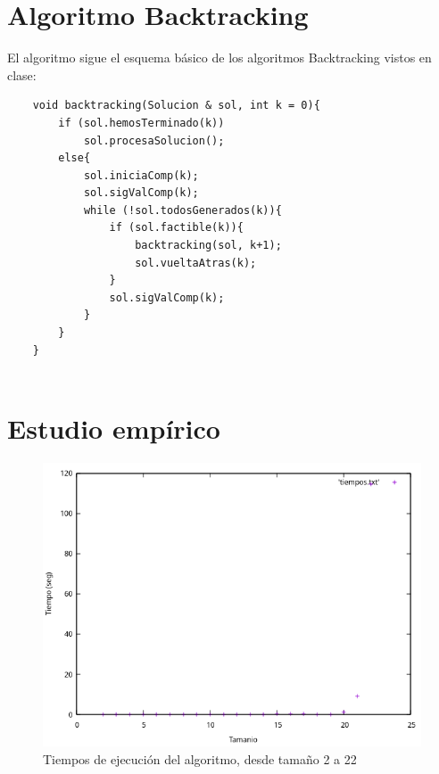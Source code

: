 \documentclass{article}
\begin{document}
	\section{Algoritmo Backtracking}
	El algoritmo sigue el esquema básico de los algoritmos Backtracking vistos en clase: 
	
	\begin{lstlisting}
	void backtracking(Solucion & sol, int k = 0){
		if (sol.hemosTerminado(k))
			sol.procesaSolucion();
		else{
			sol.iniciaComp(k);
			sol.sigValComp(k);
			while (!sol.todosGenerados(k)){
				if (sol.factible(k)){
					backtracking(sol, k+1);
					sol.vueltaAtras(k);
				}
				sol.sigValComp(k);
			}
		}
	}
	
	\end{lstlisting}
	
	
	
	\section{Estudio empírico}
	\begin{figure}[H]
		\centering
		\includegraphics[totalheight=7cm]{grafica1}
		\caption{Tiempos de ejecución del algoritmo, desde tamaño 2 a 22}
		\label{fig:eficiencia_empirica}
	\end{figure}
\end{document}
